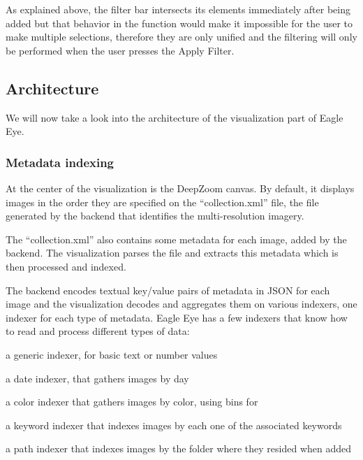As explained above, the filter bar intersects its elements immediately after being added but that behavior in the function would make it impossible for the user to make multiple selections, therefore they are only unified and the filtering will only be performed when the user presses the Apply Filter.




\subsection{Architecture}

We will now take a look into the architecture of the visualization part of Eagle Eye.


\subsubsection{Metadata indexing}

At the center of the visualization is the DeepZoom canvas. By default, it displays images in the order they are specified on the ``collection.xml'' file, the file generated by the backend that identifies the multi-resolution imagery.

The ``collection.xml'' also contains some metadata for each image, added by the backend. The visualization parses the file and extracts this metadata which is then processed and indexed.

The backend encodes textual key/value pairs of metadata in JSON for each image and the visualization decodes and aggregates them on various indexers, one indexer for each type of metadata. Eagle Eye has a few indexers that know how to read and process different types of data:
\begin{myitemize}
	\item{a generic indexer, for basic text or number values}
	\item{a date indexer, that gathers images by day}
	\item{a color indexer that gathers images by color, using  bins for }
	\item{a keyword indexer that indexes images by each one of the associated keywords}
	\item{a path indexer that indexes images by the folder where they resided when added}
\end{myitemize}

